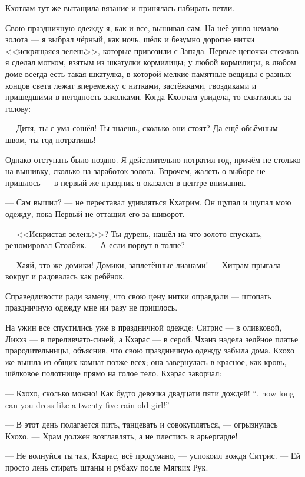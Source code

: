 Кхотлам тут же вытащила вязание и принялась набирать петли.

\asterism

\textspace

Свою праздничную одежду я, как и все, вышивал сам.
На неё ушло немало золота --- я выбрал чёрный, как ночь, шёлк и безумно дорогие нитки <<искрящаяся зелень>>, которые привозили с Запада.
Первые цепочки стежков я сделал мотком, взятым из шкатулки кормилицы;
у любой кормилицы, в любом доме всегда есть такая шкатулка, в которой мелкие памятные вещицы с разных концов света лежат вперемежку с нитками, застёжками, гвоздиками и пришедшими в негодность заколками.
Когда Кхотлам увидела, то схватилась за голову:

--- Дитя, ты с ума сошёл!
Ты знаешь, сколько они стоят?
Да ещё объёмным швом, ты год потратишь!

Однако отступать было поздно.
Я действительно потратил год, причём не столько на вышивку, сколько на заработок золота.
Впрочем, жалеть о выборе не пришлось --- в первый же праздник я оказался в центре внимания.

--- Сам вышил? --- не переставал удивляться Кхатрим.
Он щупал и щупал мою одежду, пока Первый не оттащил его за шиворот.

--- <<Искристая зелень>>?
Ты дурень, нашёл на что золото спускать, --- резюмировал Столбик.
--- А если порвут в толпе?

--- Хаяй, это же домики!
Домики, заплетённые лианами! --- Хитрам прыгала вокруг и радовалась как ребёнок.

Справедливости ради замечу, что свою цену нитки оправдали --- штопать праздничную одежду мне ни разу не пришлось.

На ужин все спустились уже в праздничной одежде: Ситрис --- в оливковой, Ликхэ --- в переливчато-синей, а Кхарас --- в серой.
Чханэ надела зелёное платье прародительницы, объяснив, что свою праздничную одежду забыла дома.
Кхохо же вышла из общих комнат позже всех;
она завернулась в красное, как кровь, шёлковое полотнище прямо на голое тело.
Кхарас заворчал:

{--- Кхохо, сколько можно! Как будто девочка двадцати пяти дождей!}
{``\Kchoho, how long can you dress like a twenty-five-rain-old girl!''}

--- В этот день полагается пить, танцевать и совокупляться, --- огрызнулась Кхохо.
--- Храм должен возглавлять, а не плестись в арьергарде!

--- Не волнуйся ты так, Кхарас, всё продумано, --- успокоил вождя Ситрис.
--- Ей просто лень стирать штаны и рубаху после Мягких Рук.

